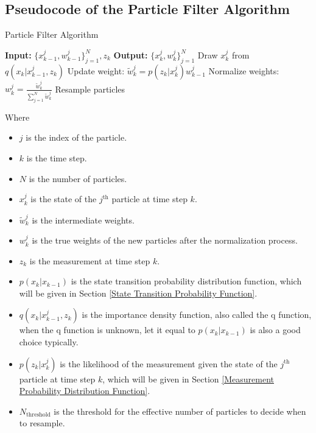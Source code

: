 \subsection{Pseudocode of the Particle Filter Algorithm}
\begin{algorithm}
\caption{Particle Filter Algorithm}\label{Particle Filter Algorithm}
\begin{algorithmic}[1]  %
    \State \textbf{Input:} $\{x_{k-1}^{j}, w_{k-1}^{j}\}_{j = 1}^N, z_k$
    \State \textbf{Output:} $\{x_k^{j}, w_k^{j}\}_{j = 1}^N$
        \State Draw $x_k^{j}$ from $q(x_k | x_{k-1}^{j}, z_k)$ 
        \State Update weight: $\tilde{w}_k^{j} = p(z_k | x_k^{j}) w_{k-1}^{j}$
    \EndFor
    \State Normalize weights: $w_k^{j} = \frac{\tilde{w}_k^{j}}{\sum_{j=1}^N \tilde{w}_k^{j}}$
        \State Resample particles
    \EndIf
\end{algorithmic}
\end{algorithm}
Where
\begin{itemize}
    \item $j$ is the index of the particle.
    \item $k$ is the time step.
    \item $N$ is the number of particles.
    \item $x_k^{j}$ is the state of the $j^\text{th}$ particle at time step $k$.
    \item $\tilde{w}_k^{j}$ is the intermediate weights.
    \item $w_k^{j}$ is the true weights of the new particles after the normalization process.
    \item $z_k$ is the measurement at time step $k$.
    \item $p(x_k | x_{k-1})$ is the state transition probability distribution function, which will be given in Section \ref{State Transition Probability Function}.
    \item $q(x_k | x_{k-1}^{j}, z_k)$ is the importance density function, also called the q function, when the q function is unknown, let it equal to $p(x_k | x_{k-1})$ is also a good choice typically.
    \item $p(z_k | x_k^{j})$ is the likelihood of the measurement given the state of the $j^\text{th}$ particle at time step $k$, which will be given in Section \ref{Measurement Probability Distribution Function}.
    \item $N_{\text{threshold}}$ is the threshold for the effective number of particles to decide when to resample.
\end{itemize}


